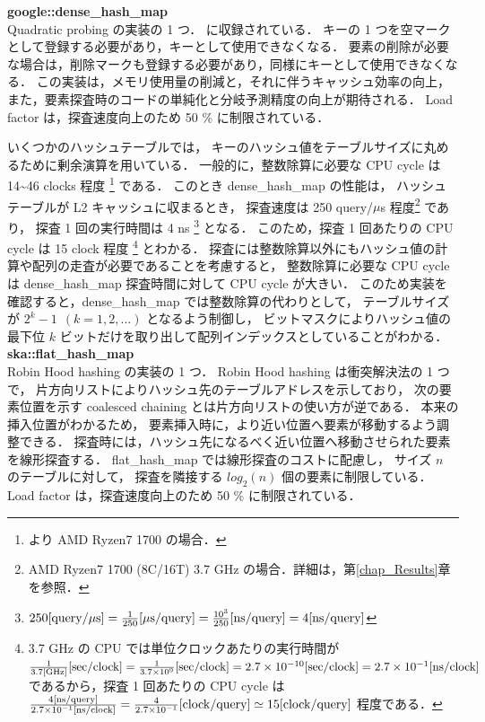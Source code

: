 {\bf google::dense\_hash\_map}
\samepage \\ \indent
Quadratic probing の実装の 1 つ．
\cite{sparsehash2005}に収録されている．
キーの 1 つを空マークとして登録する必要があり，キーとして使用できなくなる．
要素の削除が必要な場合は，削除マークも登録する必要があり，同様にキーとして使用できなくなる．
この実装は，メモリ使用量の削減と，それに伴うキャッシュ効率の向上，また，要素探査時のコードの単純化と分岐予測精度の向上が期待される．
Load factor は，探査速度向上のため 50 \% に制限されている．

いくつかのハッシュテーブルでは，
キーのハッシュ値をテーブルサイズに丸めるために剰余演算を用いている．
一般的に，整数除算に必要な CPU cycle は 14\textasciitilde 46 clocks 程度
\footnote{
  \cite{AgnerFog2018}より AMD Ryzen7 1700 の場合．
} である．
このとき dense\_hash\_map の性能は，
ハッシュテーブルが L2 キャッシュに収まるとき，
探査速度は 250 query/$\mu$s 程度\footnote{AMD Ryzen7 1700 (8C/16T) 3.7 GHz の場合．詳細は，第\ref{chap_Results}章を参照．} であり，
探査 1 回の実行時間は 4 ns
\footnote{
  $
    250{\rm [query \slash \mu s]}
    = \frac{1}{250} {\rm [\mu s \slash query]}
    = \frac{10^3}{250} {\rm [ns \slash query]}
    = 4 {\rm [ns \slash query]}
  $
} となる．
このため，探査 1 回あたりの CPU cycle は 15 clock 程度
\footnote{
  3.7 GHz の CPU では単位クロックあたりの実行時間が
  $
    \frac{1}{3.7 {\rm [GHz]}}{\rm [sec/clock]}
    = \frac{1}{3.7 \times 10^9}{\rm [sec/clock]}
    = 2.7 \times 10^{-10}{\rm [sec/clock]}
    = 2.7 \times 10^{-1}{\rm [ns/clock]}
  $
  であるから，探査 1 回あたりの CPU cycle は
  $
    \frac{ 4 {\rm [ns/query]} }{ 2.7 \times 10^{-1} {\rm [ns/clock]} }
    = \frac{ 4 }{ 2.7 \times 10^{-1} } {\rm [clock/query]}
    \simeq 15 {\rm [clock/query]}
  $
  程度である．
} とわかる．
探査には整数除算以外にもハッシュ値の計算や配列の走査が必要であることを考慮すると，
整数除算に必要な CPU cycle は dense\_hash\_map 探査時間に対して CPU cycle が大きい．
このため実装を確認すると，dense\_hash\_map では整数除算の代わりとして，
テーブルサイズが $2^k-1\ \ (k=1,2,...)$ となるよう制御し，
ビットマスクによりハッシュ値の最下位 $k$ ビットだけを取り出して配列インデックスとしていることがわかる．
\\

{\bf ska::flat\_hash\_map}
\samepage \\ \indent
Robin Hood hashing の実装の 1 つ．
Robin Hood hashing は衝突解決法の 1 つで，
片方向リストによりハッシュ先のテーブルアドレスを示しており，
次の要素位置を示す coalesced chaining とは片方向リストの使い方が逆である．
本来の挿入位置がわかるため，
要素挿入時に，より近い位置へ要素が移動するよう調整できる．
探査時には，ハッシュ先になるべく近い位置へ移動させられた要素を線形探査する．
flat\_hash\_map では線形探査のコストに配慮し，
サイズ $n$ のテーブルに対して，
探査を隣接する $log_2(n)$ 個の要素に制限している\citep{Skarupke2017}．
Load factor は，探査速度向上のため 50 \% に制限されている．

